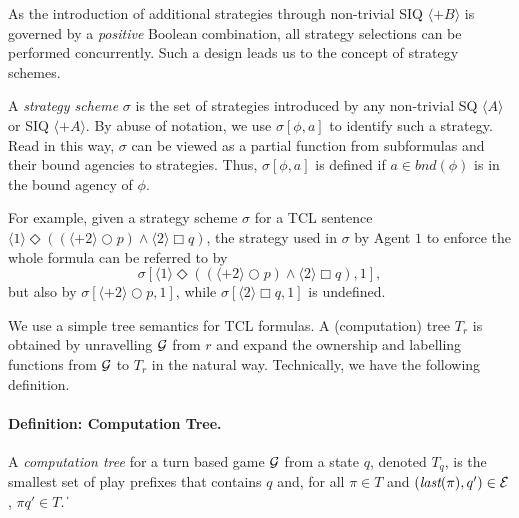 \documentclass{llncs}
\newcommand{\embnd}{\textit{bnd}}
\newcommand{\cale}{{\cal E}}
\newcommand{\calg}{{\cal G}}
\newcommand{\emlast}{\textit{last}}
\newcommand{\pfrr}{\Box}
\newcommand{\pevt}{\Diamond}
\newcommand{\nxt}{\bigcirc}
\def\qed{\ifmmode\|\else{\unskip\nobreak\hfil
\penalty50\hskip1em\null\nobreak\hfil$\blacksquare$
\parfillskip=0pt\finalhyphendemerits=0\endgraf}\fi}
\begin{document}
As the introduction of additional strategies through non-trivial SIQ $\langle +B\rangle$ is governed by a \emph{positive} 
Boolean combination, all strategy selections can be performed concurrently.
Such a design leads us to the concept of strategy schemes.

A {\em strategy scheme} $\sigma$ is the set of strategies introduced by any non-trivial SQ $\langle A \rangle$ or SIQ $\langle + A \rangle$.
By abuse of notation, we use $\sigma[\phi,a]$ to identify such a strategy.
Read in this way, $\sigma$ can be viewed as a partial function from subformulas and their bound agencies to strategies.
Thus, $\sigma[\phi,a]$ is defined if $a\in \embnd(\phi)$ is in the bound agency of $\phi$.


For example, given a strategy scheme $\sigma$ for a 
TCL sentence $\langle 1\rangle \pevt ((\langle+2\rangle \nxt p)\wedge\langle 2\rangle\pfrr q)$, 
the strategy used in $\sigma$ by Agent $1$ to enforce 
the whole formula can be referred to by
\[\sigma[\langle 1\rangle \pevt ((\langle+2\rangle \nxt p)\wedge\langle 2\rangle\pfrr q),1],\]
but also by $\sigma[\langle+2\rangle \nxt p,1]$, while $\sigma[\langle 2\rangle\pfrr q,1]$ is undefined.


We use a simple tree semantics for TCL formulas. 
A (computation) tree $T_r$ is obtained by unravelling $\calg$ from $r$  
and expand the ownership 
and labelling functions from $\calg$ to $T_r$ in the natural way.
Technically, we have the following definition.  

\paragraph{\bf Definition: Computation Tree.} 
A {\em computation tree} for a turn based game $\calg$ from a state $q$, 
denoted $T_q$, is the smallest set of play prefixes that contains $q$ and, for all $\pi\in T$ and $(\emlast(\pi),q')\in \cale$, $\pi q'\in T$.
\qed 
\end{document}

